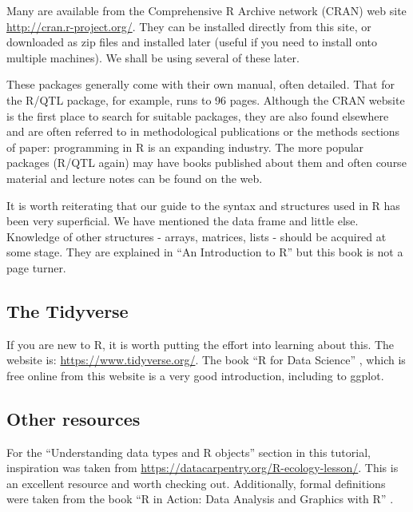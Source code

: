 \documentclass[
]{book}
\makeatletter
\newenvironment{kframe}{%
\medskip{}
\setlength{\fboxsep}{.8em}
 \def\at@end@of@kframe{}%
 \ifinner\ifhmode%
  \def\at@end@of@kframe{\end{minipage}}%
  \begin{minipage}{\columnwidth}%
 \fi\fi%
 \def\FrameCommand##1{\hskip\@totalleftmargin \hskip-\fboxsep
 \colorbox{shadecolor}{##1}\hskip-\fboxsep
     \hskip-\linewidth \hskip-\@totalleftmargin \hskip\columnwidth}%
 \MakeFramed {\advance\hsize-\width
   \@totalleftmargin\z@ \linewidth\hsize
   \@setminipage}}%
 {\par\unskip\endMakeFramed%
 \at@end@of@kframe}
\newenvironment{rmdblock}[1]
  {
  \begin{itemize}
  \renewcommand{\labelitemi}{
    \raisebox{-.7\height}[0pt][0pt]{
      {\setkeys{Gin}{width=3em,keepaspectratio}\texttt{[image: images/\#1]}}
    }
  }
  \setlength{\fboxsep}{1em}
  \begin{kframe}
  \item
  }
  {
  \end{kframe}
  \end{itemize}
  }
\newenvironment{rmdwarning}
  {\begin{rmdblock}{warning}}
  {\end{rmdblock}}
\makeatother
\begin{document}
Many are available from the Comprehensive R Archive network (CRAN) web site \url{http://cran.r-project.org/}. They can be installed directly from this site, or downloaded as zip files and installed later (useful if you need to install onto multiple machines). We shall be using several of these later.

These packages generally come with their own manual, often detailed. That for the R/QTL package, for example, runs to 96 pages. Although the CRAN website is the first place to search for suitable packages, they are also found elsewhere and are often referred to in methodological publications or the methods sections of paper: programming in R is an expanding industry. The more popular packages (R/QTL again) may have books published about them and often course material and lecture notes can be found on the web.

\begin{rmdwarning}
It is worth reiterating that our guide to the syntax and structures used in R has been very superficial. We have mentioned the data frame and little else. Knowledge of other structures - arrays, matrices, lists - should be acquired at some stage. They are explained in ``An Introduction to R'' but this book is not a page turner.
\end{rmdwarning}

\hypertarget{the-tidyverse}{%
\subsection{The Tidyverse}\label{the-tidyverse}}

If you are new to R, it is worth putting the effort into learning about this. The website is: \url{https://www.tidyverse.org/}. The book ``R for Data Science'' \citep{wickham_r_2016}, which is free online from this website is a very good introduction, including to ggplot.

\hypertarget{other-resources}{%
\subsection{Other resources}\label{other-resources}}

For the ``Understanding data types and R objects'' section in this tutorial, inspiration was taken from \url{https://datacarpentry.org/R-ecology-lesson/}. This is an excellent resource and worth checking out. Additionally, formal definitions were taken from the book ``R in Action: Data Analysis and Graphics with R'' \citep{kabacoff_r_2011}.
\end{document}

